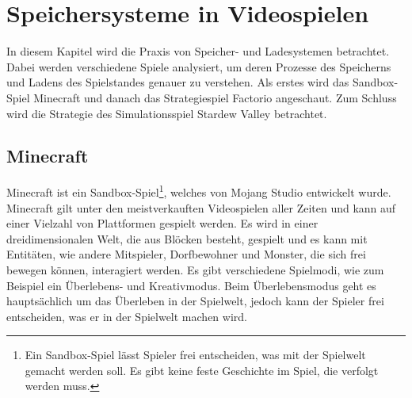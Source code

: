 \chapter{Speichersysteme in Videospielen}\label{ch:videospiele}
In diesem Kapitel wird die Praxis von Speicher- und Ladesystemen betrachtet. Dabei werden verschiedene Spiele analysiert, um deren Prozesse des Speicherns und Ladens des Spielstandes genauer zu verstehen. Als erstes wird das Sandbox-Spiel Minecraft und danach das Strategiespiel Factorio angeschaut. Zum Schluss wird die Strategie des Simulationsspiel Stardew Valley betrachtet.


\section{Minecraft}
Minecraft ist ein Sandbox-Spiel\footnote{Ein Sandbox-Spiel lässt Spieler frei entscheiden, was mit der Spielwelt gemacht werden soll. Es gibt keine feste Geschichte im Spiel, die verfolgt werden muss.\cite{ocio2009multi}}, welches von Mojang Studio entwickelt wurde. Minecraft gilt unter den meistverkauften Videospielen aller Zeiten und kann auf einer Vielzahl von Plattformen gespielt werden.\cite{ignBestSellingVideo} Es wird in einer dreidimensionalen Welt, die aus Blöcken besteht, gespielt und es kann mit Entitäten, wie andere Mitspieler, Dorfbewohner und Monster, die sich frei bewegen können, interagiert werden. Es gibt verschiedene Spielmodi, wie zum Beispiel ein Überlebens- und Kreativmodus. Beim Überlebensmodus geht es hauptsächlich um das Überleben in der Spielwelt, jedoch kann der Spieler frei entscheiden, was er in der Spielwelt machen wird.\cite{minecraftWikiHome}

